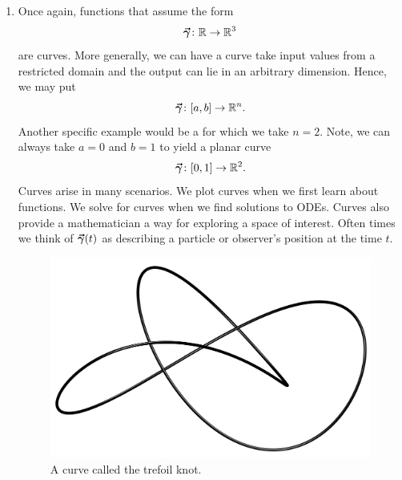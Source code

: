         \begin{enumerate}[(1)]
        \item Once again, functions that assume the form
        \[
        \boldsymbol{\vec{\gamma}} \colon \mathbb{R}\to \mathbb{R}^3
        \]
        are curves. More generally, we can have a curve take input values from a restricted domain and the output can lie in an arbitrary dimension. Hence, we may put
        \[
        \boldsymbol{\vec{\gamma}} \colon [a,b]\to \mathbb{R}^n.
        \]
        Another specific example would be a  for which we take $n=2$. Note, we can always take $a=0$ and $b=1$ to yield a planar curve 
        \[
            \boldsymbol{\vec{\gamma}} \colon [0,1] \to \mathbb{R}^2.
        \]
        Curves arise in many scenarios. We plot curves when we first learn about functions. We solve for curves when we find solutions to ODEs. Curves also provide a mathematician a way for exploring a space of interest. Often times we think of $\boldsymbol{\vec{\gamma}}(t)$ as describing a particle or observer's position at the time $t$.

        \begin{figure}[H]
            \centering
            \includegraphics[width=.8\textwidth]{Figures_Part_5/trefoil.png}
            \caption{A curve called the trefoil knot.}
        \end{figure}
        

\end{enumerate}
